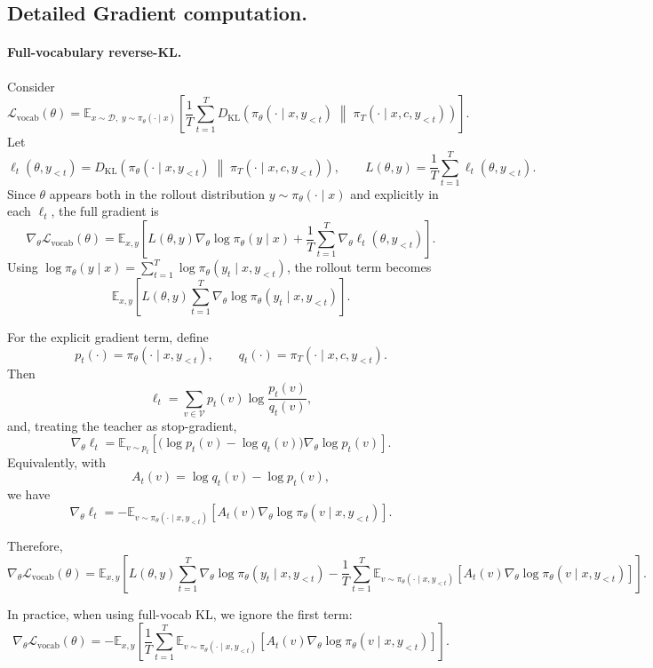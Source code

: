 \subsection{Detailed Gradient computation.}

\paragraph{Full-vocabulary reverse-KL.}
Consider
\[
\mathcal{L}_{\mathrm{vocab}}(\theta)
=
\mathbb{E}_{x\sim\mathcal D,\; y\sim\pi_\theta(\cdot\mid x)}
\left[
\frac{1}{T}\sum_{t=1}^T
D_{\mathrm{KL}}\!\left(
\pi_\theta(\cdot\mid x,y_{<t})
\;\middle\|\;
\pi_T(\cdot\mid x,c,y_{<t})
\right)
\right].
\]
Let
\[
\ell_t(\theta,y_{<t})
=
D_{\mathrm{KL}}\!\left(
\pi_\theta(\cdot\mid x,y_{<t})
\;\middle\|\;
\pi_T(\cdot\mid x,c,y_{<t})
\right),
\qquad
L(\theta,y)=\frac{1}{T}\sum_{t=1}^T \ell_t(\theta,y_{<t}).
\]
Since \(\theta\) appears both in the rollout distribution \(y\sim\pi_\theta(\cdot\mid x)\) and explicitly in each \(\ell_t\), the full gradient is
\[
\nabla_\theta \mathcal{L}_{\mathrm{vocab}}(\theta)
=
\mathbb{E}_{x,y}
\left[
L(\theta,y)\nabla_\theta \log \pi_\theta(y\mid x)
+
\frac{1}{T}\sum_{t=1}^T \nabla_\theta \ell_t(\theta,y_{<t})
\right].
\]
Using \(\log \pi_\theta(y\mid x)=\sum_{t=1}^T \log \pi_\theta(y_t\mid x,y_{<t})\), the rollout term becomes
\[
\mathbb{E}_{x,y}
\left[
L(\theta,y)\sum_{t=1}^T \nabla_\theta \log \pi_\theta(y_t\mid x,y_{<t})
\right].
\]

For the explicit gradient term, define
\[
p_t(\cdot)=\pi_\theta(\cdot\mid x,y_{<t}),
\qquad
q_t(\cdot)=\pi_T(\cdot\mid x,c,y_{<t}).
\]
Then
\[
\ell_t=\sum_{v\in\mathcal V} p_t(v)\log\frac{p_t(v)}{q_t(v)},
\]
and, treating the teacher as stop-gradient,
\[
\nabla_\theta \ell_t
=
\mathbb{E}_{v\sim p_t}
\left[
\bigl(\log p_t(v)-\log q_t(v)\bigr)\nabla_\theta \log p_t(v)
\right].
\]
Equivalently, with
\[
A_t(v)=\log q_t(v)-\log p_t(v),
\]
we have
\[
\nabla_\theta \ell_t
=
-
\mathbb{E}_{v\sim\pi_\theta(\cdot\mid x,y_{<t})}
\left[
A_t(v)\nabla_\theta \log \pi_\theta(v\mid x,y_{<t})
\right].
\]

Therefore,
\[
\nabla_\theta \mathcal{L}_{\mathrm{vocab}}(\theta)
=
\mathbb{E}_{x,y}
\left[
L(\theta,y)\sum_{t=1}^T \nabla_\theta \log \pi_\theta(y_t\mid x,y_{<t})
-
\frac{1}{T}\sum_{t=1}^T
\mathbb{E}_{v\sim\pi_\theta(\cdot\mid x,y_{<t})}
\left[
A_t(v)\nabla_\theta \log \pi_\theta(v\mid x,y_{<t})
\right]
\right].
\]

In practice, when using full-vocab KL, we ignore the first term:
\[
\nabla_\theta \mathcal{L}_{\mathrm{vocab}}(\theta)
=
-
\mathbb{E}_{x,y}
\left[
\frac{1}{T}\sum_{t=1}^T
\mathbb{E}_{v\sim\pi_\theta(\cdot\mid x,y_{<t})}
\left[
A_t(v)\nabla_\theta \log \pi_\theta(v\mid x,y_{<t})
\right]
\right].
\]


